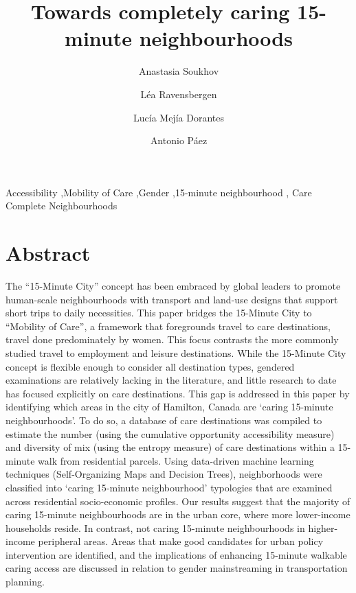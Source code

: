 \documentclass[
  authoryear,
  preprint,
  3p]{elsarticle}
\begin{document}
\begin{frontmatter}
\title{Towards completely caring 15-minute neighbourhoods}
\author[1]{Anastasia Soukhov%
%
}
\author[1]{Léa Ravensbergen%
%
}
\author[2]{Lucía Mejía Dorantes%
%
}
\author[1]{Antonio Páez%
%
}






        





\begin{keyword}
    Accessibility \sep Mobility of Care \sep Gender \sep 15-minute
neighbourhood \sep 
    Care Complete Neighbourhoods
\end{keyword}
\end{frontmatter}
    
\section{Abstract}\label{abstract}

The ``15-Minute City'' concept has been embraced by global leaders to
promote human-scale neighbourhoods with transport and land-use designs
that support short trips to daily necessities. This paper bridges the
15-Minute City to ``Mobility of Care'', a framework that foregrounds
travel to care destinations, travel done predominately by women. This
focus contrasts the more commonly studied travel to employment and
leisure destinations. While the 15-Minute City concept is flexible
enough to consider all destination types, gendered examinations are
relatively lacking in the literature, and little research to date has
focused explicitly on care destinations. This gap is addressed in this
paper by identifying which areas in the city of Hamilton, Canada are
`caring 15-minute neighbourhoods'. To do so, a database of care
destinations was compiled to estimate the number (using the cumulative
opportunity accessibility measure) and diversity of mix (using the
entropy measure) of care destinations within a 15-minute walk from
residential parcels. Using data-driven machine learning techniques
(Self-Organizing Maps and Decision Trees), neighborhoods were classified
into `caring 15-minute neighbourhood' typologies that are examined
across residential socio-economic profiles. Our results suggest that the
majority of caring 15-minute neighbourhoods are in the urban core, where
more lower-income households reside. In contrast, not caring 15-minute
neighbourhoods in higher-income peripheral areas. Areas that make good
candidates for urban policy intervention are identified, and the
implications of enhancing 15-minute walkable caring access are discussed
in relation to gender mainstreaming in transportation planning.
\end{document}
